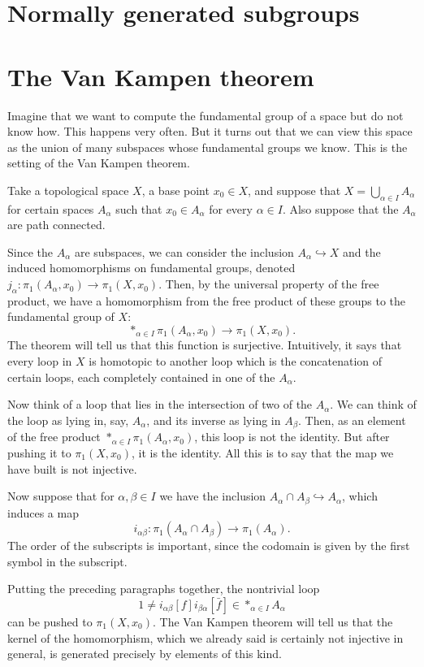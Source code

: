 \documentclass{book}
\theoremstyle{definition}
\begin{document}
\section{Normally generated subgroups}

\section{The Van Kampen theorem}

Imagine that we want to compute the fundamental group of a
space but do not know how. This happens very often. But it
turns out that we can view this space as the union of many
subspaces whose fundamental groups we know. This is the
setting of the Van Kampen theorem.

Take a topological space $X$, a base point $x_0\in X$, and
suppose that $X=\bigcup_{\alpha\in I}A_\alpha$ for certain
spaces $A_\alpha$ such that $x_0\in A_\alpha$ for every
$\alpha\in I$. Also suppose that the $A_\alpha$ are path
connected.

Since the $A_\alpha$ are subspaces, we can consider the
inclusion $A_\alpha\hookrightarrow X$ and the induced
homomorphisms on fundamental groups, denoted
$j_\alpha:\pi_1(A_\alpha,x_0)\to\pi_1(X,x_0)$. Then, by the
universal property of the free product, we have a
homomorphism from the free product of these groups to the
fundamental group of $X$:
$$
\ast_{\alpha\in I}\pi_1(A_\alpha,x_0)
\to
\pi_1(X,x_0).
$$
The theorem will tell us that this function is surjective.
Intuitively, it says that every loop in $X$ is homotopic to
another loop which is the concatenation of certain loops,
each completely contained in one of the $A_\alpha$.

Now think of a loop that lies in the intersection of two of
the $A_\alpha$. We can think of the loop as lying in, say,
$A_\alpha$, and its inverse as lying in $A_\beta$. Then, as
an element of the free product
$\ast_{\alpha\in I}\pi_1(A_\alpha,x_0)$, this loop is not the
identity. But after pushing it to $\pi_1(X,x_0)$, it is the
identity. All this is to say that the map we have built is
not injective.

Now suppose that for $\alpha,\beta\in I$ we have the
inclusion $A_\alpha\cap A_\beta\hookrightarrow A_\alpha$,
which induces a map
$$
i_{\alpha\beta}:\pi_1(A_\alpha\cap A_\beta)
\to
\pi_1(A_\alpha).
$$
The order of the subscripts is important, since the
codomain is given by the first symbol in the subscript.

Putting the preceding paragraphs together, the nontrivial
loop
$$
1\neq i_{\alpha\beta}[f]i_{\beta\alpha}[\bar f]
\in \ast_{\alpha\in I}A_\alpha
$$
can be pushed to $\pi_1(X,x_0)$. The Van Kampen theorem
will tell us that the kernel of the homomorphism, which we
already said is certainly not injective in general, is
generated precisely by elements of this kind.
\end{document}
